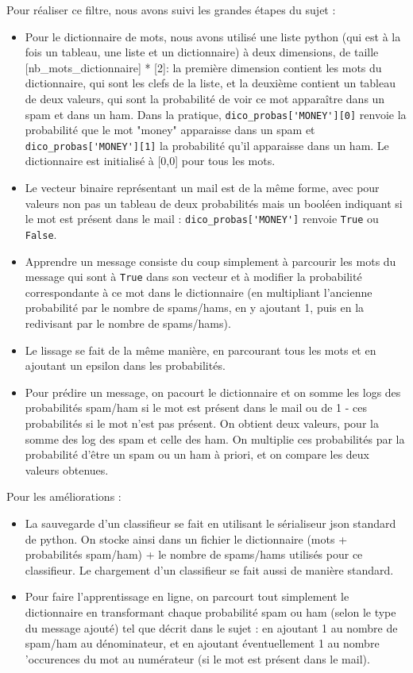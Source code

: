 \documentclass{report}
\begin{document}
\noindent Pour réaliser ce filtre, nous avons suivi les grandes étapes du sujet : 
\begin{itemize}
\item Pour le dictionnaire de mots, nous avons utilisé une liste python (qui est à la fois un tableau, une liste et un dictionnaire) à deux dimensions, de taille [nb_mots_dictionnaire] * [2]: la première dimension contient les mots du dictionnaire, qui sont les clefs de la liste, et la deuxième contient un tableau de deux valeurs, qui sont la probabilité de voir ce mot apparaître dans un spam et dans un ham. Dans la pratique, \verb|dico_probas['MONEY'][0]| renvoie la probabilité que le mot "money" apparaisse dans un spam et \verb|dico_probas['MONEY'][1]| la probabilité qu'il apparaisse dans un ham. Le dictionnaire est initialisé à [0,0] pour tous les mots.
\item Le vecteur binaire représentant un mail est de la même forme, avec pour valeurs non pas un tableau de deux probabilités mais un booléen indiquant si le mot est présent dans le mail : \verb|dico_probas['MONEY']| renvoie \verb|True| ou \verb|False|.
\item Apprendre un message consiste du coup simplement à parcourir les mots du message qui sont à \verb|True| dans son vecteur et à modifier la probabilité correspondante à ce mot dans le dictionnaire (en multipliant l'ancienne probabilité par le nombre de spams/hams, en y ajoutant 1, puis en la redivisant par le nombre de spams/hams).
\item Le lissage se fait de la même manière, en parcourant tous les mots et en ajoutant un epsilon dans les probabilités.
\item Pour prédire un message, on pacourt le dictionnaire et on somme les logs des probabilités spam/ham si le mot est présent dans le mail ou de 1 - ces probabilités si le mot n'est pas présent. On obtient deux valeurs, pour la somme des log des spam et celle des ham. On multiplie ces probabilités par la probabilité d'être un spam ou un ham à priori, et on compare les deux valeurs obtenues.
\end{itemize}
\noindent Pour les améliorations : 
\begin{itemize}
\item La sauvegarde d'un classifieur se fait en utilisant le sérialiseur json standard de python. On stocke ainsi dans un fichier le dictionnaire (mots + probabilités spam/ham) + le nombre de spams/hams utilisés pour ce classifieur. Le chargement d'un classifieur se fait aussi de manière standard.
\item Pour faire l'apprentissage en ligne, on parcourt tout simplement le dictionnaire en transformant chaque probabilité spam ou ham (selon le type du message ajouté) tel que décrit dans le sujet : en ajoutant 1 au nombre de spam/ham au dénominateur, et en ajoutant éventuellement 1 au nombre 'occurences du mot au numérateur (si le mot est présent dans le mail). 
\end{itemize}
\end{document}
